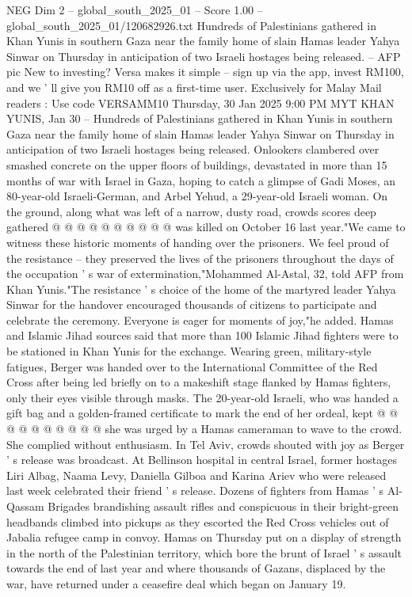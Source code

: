 \begin{textsample}{NEG Dim 2 – global\_south\_2025\_01 – Score 1.00 – global\_south\_2025\_01/120682926.txt}  \label{ex:f2_neg_119}
Hundreds of Palestinians gathered in Khan Yunis in southern Gaza near the family home of slain Hamas leader Yahya Sinwar on Thursday in anticipation of two Israeli hostages being released. -- AFP pic New to investing?
Versa makes it simple -- sign up via the app, invest RM100, and we ' ll give you RM10 off as a first-time user.
Exclusively for Malay Mail readers : Use code VERSAMM10 Thursday, 30 Jan 2025 9:00 PM MYT KHAN YUNIS, Jan 30 -- Hundreds of Palestinians gathered in Khan Yunis in southern Gaza near the family home of slain Hamas leader Yahya Sinwar on Thursday in anticipation of two Israeli hostages being released.
Onlookers clambered over smashed concrete on the upper floors of buildings, devastated in more than 15 months of war with Israel in Gaza, hoping to catch a glimpse of Gadi Moses, an 80-year-old Israeli-German, and Arbel Yehud, a 29-year-old Israeli woman.
On the ground, along what was left of a narrow, dusty road, crowds scores deep gathered @ @ @ @ @ @ @ @ @ @ was killed on October 16 last year."We came to witness these historic moments of handing over the prisoners.
We feel proud of the resistance -- they preserved the lives of the prisoners throughout the days of the occupation ' s war of extermination,"Mohammed Al-Astal, 32, told AFP from Khan Yunis."The resistance ' s choice of the home of the martyred leader Yahya Sinwar for the handover encouraged thousands of citizens to participate and celebrate the ceremony.
Everyone is eager for moments of joy,"he added.
Hamas and Islamic Jihad sources said that more than 100 Islamic Jihad fighters were to be stationed in Khan Yunis for the exchange.
Wearing green, military-style fatigues, Berger was handed over to the International Committee of the Red Cross after being led briefly on to a makeshift stage flanked by Hamas fighters, only their eyes visible through masks.
The 20-year-old Israeli, who was handed a gift bag and a golden-framed certificate to mark the end of her ordeal, kept @ @ @ @ @ @ @ @ @ @ she was urged by a Hamas cameraman to wave to the crowd.
She complied without enthusiasm.
In Tel Aviv, crowds shouted with joy as Berger ' s release was broadcast.
At Bellinson hospital in central Israel, former hostages Liri Albag, Naama Levy, Daniella Gilboa and Karina Ariev who were released last week celebrated their friend ' s release.
Dozens of fighters from Hamas ' s Al-Qassam Brigades brandishing assault rifles and conspicuous in their bright-green headbands climbed into pickups as they escorted the Red Cross vehicles out of Jabalia refugee camp in convoy.
Hamas on Thursday put on a display of strength in the north of the Palestinian territory, which bore the brunt of Israel ' s assault towards the end of last year and where thousands of Gazans, displaced by the war, have returned under a ceasefire deal which began on January 19.

\end{textsample}
